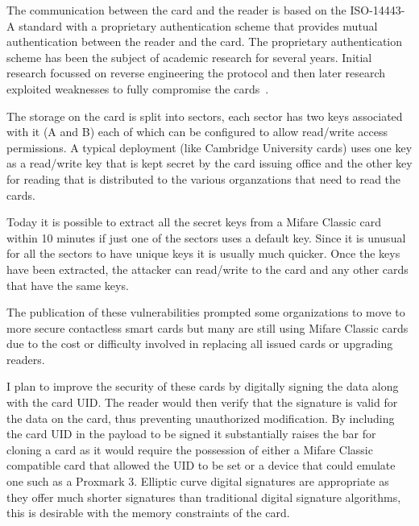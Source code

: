\documentclass[a4paper, 12pt]{article}
\begin{document}
  The communication between the card and the reader is based on the ISO-14443-A
  standard with a proprietary authentication scheme that provides mutual
  authentication between the reader and the card. The proprietary authentication
  scheme has been the subject of academic research for several years. Initial
  research focussed on reverse engineering the protocol and then later research
  exploited weaknesses to fully compromise the cards~\cite{tan2009practical}.

  The storage on the card is split into sectors, each sector has two keys
  associated with it (A and B) each of which can be configured to allow
  read/write access permissions. A typical deployment (like Cambridge University
  cards) uses one key as a read/write key that is kept secret by the card
  issuing office and the other key for reading that is distributed to the
  various organzations that need to read the cards.

  Today it is possible to extract all the secret keys from a Mifare Classic card
  within 10 minutes if just one of the sectors uses a default
  key\footnotemark{}. Since it is unusual for all the sectors to have unique
  keys it is usually much quicker. Once the keys have been extracted, the
  attacker can read/write to the card and any other cards that have the same
  keys.


  The publication of these vulnerabilities prompted some organizations to move
  to more secure contactless smart cards but many are still using Mifare Classic
  cards due to the cost or difficulty involved in replacing all issued cards or
  upgrading readers.

  I plan to improve the security of these cards by digitally signing the data
  along with the card UID\@. The reader would then verify that the signature is
  valid for the data on the card, thus preventing unauthorized modification. By
  including the card UID in the payload to be signed it substantially raises the
  bar for cloning a card as it would require the possession of either a Mifare
  Classic compatible card that allowed the UID to be set or a device that could
  emulate one such as a Proxmark 3. Elliptic curve digital signatures are
  appropriate as they offer much shorter signatures than traditional digital
  signature algorithms, this is desirable with the memory constraints of the
  card.
\end{document}
